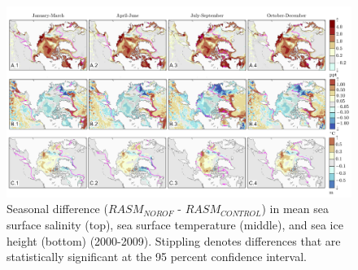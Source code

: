 \documentclass[jgrga, draft]{agutex}
\begin{document}
\clearpage
\begin{figure}
\noindent\includegraphics[width=40pc,natwidth=1]{ocean_combine}
\caption{Seasonal difference ($RASM_{NOROF}$ - $RASM_{CONTROL}$) in mean sea surface salinity (top), sea surface temperature (middle), and sea ice height (bottom) (2000-2009). Stippling denotes differences that are statistically significant at the 95 percent confidence interval.}
\label{fig:ocean_maps}
\end{figure}

\clearpage

\begin{table}
  \caption{RVIC model performance statistics for the six rivers shown in Figures \ref{fig:calibration_hydrographs} and \ref{fig:hydrographs}.}
  \centering
  \label{table:rivers}
\end{table}
\end{document}
